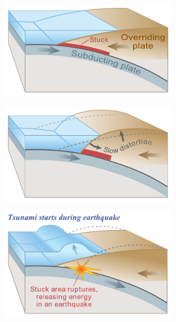 \begin{figure}[h]
  \begin{subfigure}{.5\textwidth}
    \centering
    \includegraphics[width=\textwidth]{figures/tsunami-gen-0.pdf}
  \end{subfigure}
  \begin{subfigure}{.5\textwidth}
    \centering
    \includegraphics[width=\textwidth]{figures/tsunami-gen-1.pdf}
  \end{subfigure}
  \begin{subfigure}{.5\textwidth}
    \centering
    \includegraphics[width=\textwidth]{figures/tsunami-gen-2.pdf}

\end{subfigure}
\end{figure}
